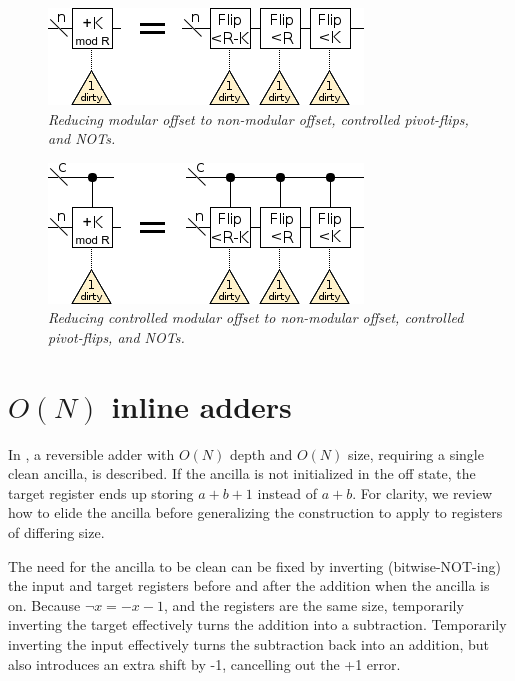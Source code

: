 \documentclass[twocolumn]{article}
\begin{document}
\begin{figure}
  \centering
  \includegraphics[width=\linewidth]{assets/modular-offset.png}
  \caption{\em Reducing modular offset to non-modular offset, controlled pivot-flips, and NOTs.}
  \label{fig:modular-add}
\end{figure}

\begin{figure}
  \centering
  \includegraphics[width=\linewidth]{assets/controlled-modular-offset.png}
  \caption{\em Reducing controlled modular offset to non-modular offset, controlled pivot-flips, and NOTs.}
  \label{fig:modular-add}
\end{figure}

\section{$O(N)$ inline adders}

In \cite{van2004}, a reversible adder with $O(N)$ depth and $O(N)$ size, requiring a single clean ancilla, is described.
If the ancilla is not initialized in the off state, the target register ends up storing $a+b+1$ instead of $a+b$.
For clarity, we review how to elide the ancilla before generalizing the construction to apply to registers of differing size.

The need for the ancilla to be clean can be fixed by inverting (bitwise-NOT-ing) the input and target registers before and after the addition when the ancilla is on.
Because $\lnot x = -x-1$, and the registers are the same size, temporarily inverting the target effectively turns the addition into a subtraction.
Temporarily inverting the input effectively turns the subtraction back into an addition, but also introduces an extra shift by -1, cancelling out the +1 error.
\end{document}
